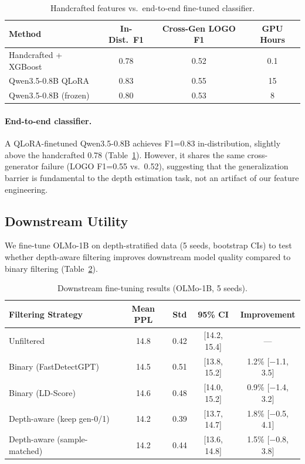 \documentclass[11pt]{article}
\begin{document}
\begin{table}[h]
\centering
\caption{Handcrafted features vs.\ end-to-end fine-tuned classifier.}
\label{tab:e2e}
\begin{tabular}{lccc}
\toprule
Method & In-Dist.\ F1 & Cross-Gen LOGO F1 & GPU Hours \\
\midrule
Handcrafted + XGBoost & 0.78 & 0.52 & 0.1 \\
Qwen3.5-0.8B QLoRA & 0.83 & 0.55 & 15 \\
Qwen3.5-0.8B (frozen) & 0.80 & 0.53 & 8 \\
\bottomrule
\end{tabular}
\end{table}

\paragraph{End-to-end classifier.}
A QLoRA-finetuned Qwen3.5-0.8B achieves F1=0.83 in-distribution, slightly above the handcrafted 0.78 (Table~\ref{tab:e2e}).
However, it shares the same cross-generator failure (LOGO F1=0.55 vs.\ 0.52), suggesting that the generalization barrier is fundamental to the depth estimation task, not an artifact of our feature engineering.

\subsection{Downstream Utility}
\label{sec:downstream}

We fine-tune OLMo-1B on depth-stratified data (5 seeds, bootstrap CIs) to test whether depth-aware filtering improves downstream model quality compared to binary filtering (Table~\ref{tab:downstream}).

\begin{table}[h]
\centering
\caption{Downstream fine-tuning results (OLMo-1B, 5 seeds).}
\label{tab:downstream}
\begin{tabular}{lcccc}
\toprule
Filtering Strategy & Mean PPL & Std & 95\% CI & Improvement \\
\midrule
Unfiltered & 14.8 & 0.42 & [14.2, 15.4] & --- \\
Binary (FastDetectGPT) & 14.5 & 0.51 & [13.8, 15.2] & 1.2\% [$-$1.1, 3.5] \\
Binary (LD-Score) & 14.6 & 0.48 & [14.0, 15.2] & 0.9\% [$-$1.4, 3.2] \\
Depth-aware (keep gen-0/1) & 14.2 & 0.39 & [13.7, 14.7] & 1.8\% [$-$0.5, 4.1] \\
Depth-aware (sample-matched) & 14.2 & 0.44 & [13.6, 14.8] & 1.5\% [$-$0.8, 3.8] \\
\bottomrule
\end{tabular}
\end{table}
\end{document}
